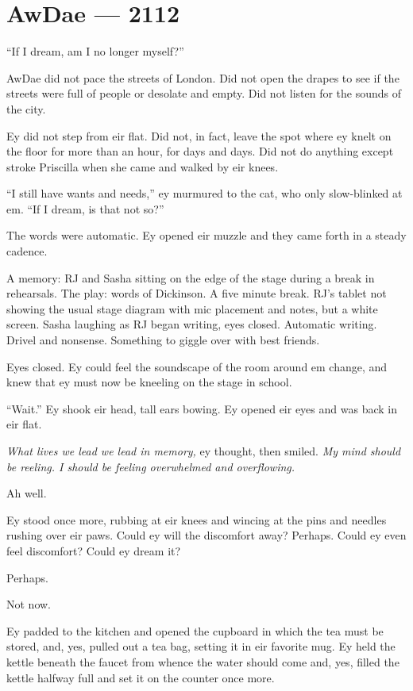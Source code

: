 \hypertarget{rj-brewster-2112}{%
\chapter*{AwDae — 2112}\label{rj-brewster-2112}}

``If I dream, am I no longer myself?''

AwDae did not pace the streets of London. Did not open the drapes to see if the streets were full of people or desolate and empty. Did not listen for the sounds of the city.

Ey did not step from eir flat. Did not, in fact, leave the spot where ey knelt on the floor for more than an hour, for days and days. Did not do anything except stroke Priscilla when she came and walked by eir knees.

``I still have wants and needs,'' ey murmured to the cat, who only slow-blinked at em. ``If I dream, is that not so?''

The words were automatic. Ey opened eir muzzle and they came forth in a steady cadence.

A memory: RJ and Sasha sitting on the edge of the stage during a break in rehearsals. The play: words of Dickinson. A five minute break. RJ's tablet not showing the usual stage diagram with mic placement and notes, but a white screen. Sasha laughing as RJ began writing, eyes closed. Automatic writing. Drivel and nonsense. Something to giggle over with best friends.

Eyes closed. Ey could feel the soundscape of the room around em change, and knew that ey must now be kneeling on the stage in school.

``Wait.'' Ey shook eir head, tall ears bowing. Ey opened eir eyes and was back in eir flat.

\emph{What lives we lead we lead in memory,} ey thought, then smiled. \emph{My mind should be reeling. I should be feeling overwhelmed and overflowing.}

Ah well.

Ey stood once more, rubbing at eir knees and wincing at the pins and needles rushing over eir paws. Could ey will the discomfort away? Perhaps. Could ey even feel discomfort? Could ey dream it?

Perhaps.

Not now.

Ey padded to the kitchen and opened the cupboard in which the tea must be stored, and, yes, pulled out a tea bag, setting it in eir favorite mug. Ey held the kettle beneath the faucet from whence the water should come and, yes, filled the kettle halfway full and set it on the counter once more.

